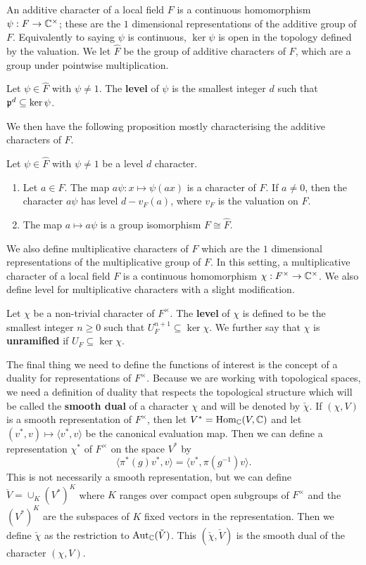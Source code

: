 An additive character of a local field $F$ is a continuous homomorphism $\psi: F \to \mathbb{C}^\times$; these are the $1$ dimensional representations of the additive group of $F$.
Equivalently to saying $\psi$ is continuous, $\ker \psi$ is open in the topology defined by the valuation.
We let $\hat{F}$ be the group of additive characters of $F$, which are a group under pointwise multiplication.
\begin{defn}
  Let $\psi \in \hat{F}$ with $\psi \neq 1$.
  The \textbf{level} of $\psi$ is the smallest integer $d$ such that $\mathfrak{p}^d \subseteq \ker \psi$.
\end{defn}
We then have the following proposition mostly characterising the additive characters of $F$.
\begin{prop}
  Let $\psi \in \hat{F}$ with $\psi \neq 1$ be a level $d$ character.
  \begin{enumerate}
    \item Let $a \in F$. The map $a \psi : x \mapsto \psi(ax)$ is a character of $F$. If $a \neq 0$, then the character $a \psi$ has level $d - v_F(a)$, where $v_F$ is the valuation on $F$.
    \item The map $a \mapsto a \psi$ is a group isomorphism $F \cong \hat{F}$.
  \end{enumerate}
\end{prop}

We also define multiplicative characters of $F$ which are the $1$ dimensional representations of the multiplicative group of $F$.
In this setting, a multiplicative character of a local field $F$ is a continuous homomorphism $\chi : F^\times \to \mathbb{C}^\times$.
We also define level for multiplicative characters with a slight modification.
\begin{defn}
  Let $\chi$ be a non-trivial character of $F^\times$.
  The \textbf{level} of $\chi$ is defined to be the smallest integer $n \geq 0$ such that $U^{n+1}_F \subseteq \ker \chi$.
  We further say that $\chi$ is \textbf{unramified} if $U_F \subseteq \ker \chi$.
\end{defn}

The final thing we need to define the functions of interest is the concept of a duality for representations of $F^\times$.
Because we are working with topological spaces, we need a definition of duality that respects the topological structure which will be called the \textbf{smooth dual} of a character $\chi$ and will be denoted by $\check{\chi}$.
If $(\chi, V)$ is a smooth representation of $F^\times$, then let $V^* = \textrm{Hom}_{\mathbb{C}}(V,\mathbb{C})$ and let $(v^* , v) \mapsto \langle v^*, v\rangle$ be the canonical evaluation map.
Then we can define a representation $\chi^*$ of $F^\times$ on the space $V^*$ by
\[\langle \pi^*(g)v^*, v\rangle = \langle v^* , \pi(g^{-1})v\rangle.\]
This is not necessarily a smooth representation, but we can define $\check{V} = \cup_K (V^*)^K$ where $K$ ranges over compact open subgroups of $F^\times$ and the $(V^*)^K$ are the subspaces of $K$ fixed vectors in the representation.
Then we define $\check{\chi}$ as the restriction to $\textrm{Aut}_{\mathbb{C}}(\check{V})$.
This $(\check{\chi},\check{V})$ is the smooth dual of the character $(\chi, V)$.
\\

